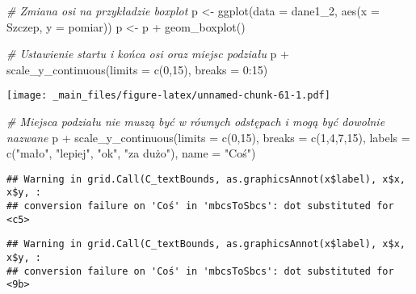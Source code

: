 \documentclass[
]{book}
\newenvironment{Shaded}{\begin{snugshade}}{\end{snugshade}}
\newcommand{\AttributeTok}[1]{\textcolor[rgb]{0.77,0.63,0.00}{#1}}
\newcommand{\CommentTok}[1]{\textcolor[rgb]{0.56,0.35,0.01}{\textit{#1}}}
\newcommand{\DecValTok}[1]{\textcolor[rgb]{0.00,0.00,0.81}{#1}}
\newcommand{\FunctionTok}[1]{\textcolor[rgb]{0.00,0.00,0.00}{#1}}
\newcommand{\NormalTok}[1]{#1}
\newcommand{\OtherTok}[1]{\textcolor[rgb]{0.56,0.35,0.01}{#1}}
\newcommand{\SpecialCharTok}[1]{\textcolor[rgb]{0.00,0.00,0.00}{#1}}
\newcommand{\StringTok}[1]{\textcolor[rgb]{0.31,0.60,0.02}{#1}}
\begin{document}
\begin{Shaded}
\begin{Highlighting}[]
\CommentTok{\# Zmiana osi na przykładzie boxplot}
\NormalTok{p }\OtherTok{\textless{}{-}} \FunctionTok{ggplot}\NormalTok{(}\AttributeTok{data =}\NormalTok{ dane1\_2, }\FunctionTok{aes}\NormalTok{(}\AttributeTok{x =}\NormalTok{ Szczep, }\AttributeTok{y =}\NormalTok{ pomiar))}
\NormalTok{p }\OtherTok{\textless{}{-}}\NormalTok{ p }\SpecialCharTok{+} \FunctionTok{geom\_boxplot}\NormalTok{()}

\CommentTok{\# Ustawienie startu i końca osi oraz miejsc podziału}
\NormalTok{p }\SpecialCharTok{+} \FunctionTok{scale\_y\_continuous}\NormalTok{(}\AttributeTok{limits =} \FunctionTok{c}\NormalTok{(}\DecValTok{0}\NormalTok{,}\DecValTok{15}\NormalTok{), }\AttributeTok{breaks =} \DecValTok{0}\SpecialCharTok{:}\DecValTok{15}\NormalTok{)}
\end{Highlighting}
\end{Shaded}

\texttt{[image: \_main\_files/figure-latex/unnamed-chunk-61-1.pdf]}

\begin{Shaded}
\begin{Highlighting}[]
\CommentTok{\# Miejsca podziału nie muszą być w równych odstępach i mogą być dowolnie nazwane}
\NormalTok{p }\SpecialCharTok{+} \FunctionTok{scale\_y\_continuous}\NormalTok{(}\AttributeTok{limits =} \FunctionTok{c}\NormalTok{(}\DecValTok{0}\NormalTok{,}\DecValTok{15}\NormalTok{), }\AttributeTok{breaks =} \FunctionTok{c}\NormalTok{(}\DecValTok{1}\NormalTok{,}\DecValTok{4}\NormalTok{,}\DecValTok{7}\NormalTok{,}\DecValTok{15}\NormalTok{), }
                       \AttributeTok{labels =} \FunctionTok{c}\NormalTok{(}\StringTok{"mało"}\NormalTok{, }\StringTok{"lepiej"}\NormalTok{, }\StringTok{"ok"}\NormalTok{, }\StringTok{"za dużo"}\NormalTok{), }
                       \AttributeTok{name =} \StringTok{"Coś"}\NormalTok{)}
\end{Highlighting}
\end{Shaded}

\begin{verbatim}
## Warning in grid.Call(C_textBounds, as.graphicsAnnot(x$label), x$x, x$y, :
## conversion failure on 'Coś' in 'mbcsToSbcs': dot substituted for <c5>
\end{verbatim}

\begin{verbatim}
## Warning in grid.Call(C_textBounds, as.graphicsAnnot(x$label), x$x, x$y, :
## conversion failure on 'Coś' in 'mbcsToSbcs': dot substituted for <9b>
\end{verbatim}
\end{document}
